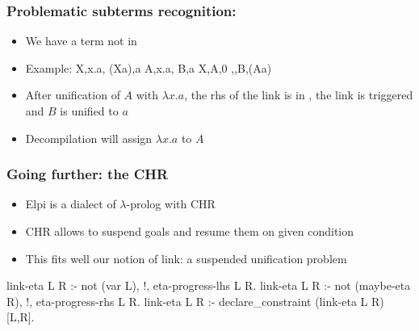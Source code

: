 \documentclass{pres}
\begin{document}
\begin{frame}
  \frametitle{Problematic subterms recognition: \maybelam}

  \begin{itemize}
    \item We have a term not in \llambda
    \item Example: 
      \printAlll
      {{{X,\lambda x.a},
        {(X\appsep a),a}}}
      {{{A,\lambda x.a},
        {B,a}}}
      {{{X,A,0}}}
      {{{\llambda,,B,(A\appsep a)}}}
    \item After unification of $A$ with $\lambda x.a$, 
        the rhs of the link is in \llambda,
        the link is triggered and $B$ is unified to $a$
    \item Decompilation will assign $\lambda x.a$ to $A$
  \end{itemize}

\end{frame}


  


\begin{frame}[fragile]
  \frametitle{Going further: the CHR}

  \begin{itemize}
    \item Elpi is a dialect of $\lambda$-prolog with CHR
    \item CHR allows to suspend goals and resume them on given condition
    \item This fits well our notion of link: a suspended unification problem
  \end{itemize}


  \mysep

  \begin{elpicode}
    link-eta L R :- not (var L), !, eta-progress-lhs L R.
    link-eta L R :- not (maybe-eta R), !, eta-progress-rhs L R.
    link-eta L R :- declare_constraint (link-eta L R) [L,R].
  \end{elpicode}


\end{frame}
\end{document}
